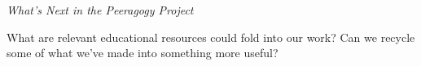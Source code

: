 
\begin{framed}
\noindent 
\emph{What's Next in the Peeragogy Project}
\begin{collectinmacro}{\ReduceWN}{}{}
What are relevant educational resources could fold into our work?
Can we recycle some of what we've made into something more useful?  
\end{collectinmacro}
\ReduceWN
\end{framed}

\newpage
